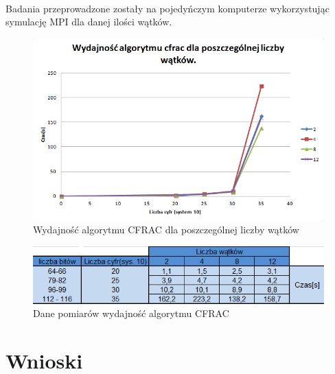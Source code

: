 \documentclass{article}
\begin{document}
\paragraph{}Badania przeprowadzone zostały na pojedyńczym komputerze wykorzystując symulację MPI dla danej ilości wątków.
\begin{figure}[h]
    \centering
    \includegraphics[width=1.0\textwidth]{cfracWydajnosc.png}
    \caption{Wydajność algorytmu CFRAC dla poszczególnej liczby wątków}
    \label{fig:cfracWykres}
\end{figure}
\begin{figure}[h]
    \centering
    \includegraphics[width=1.0\textwidth]{cfracWydajnoscTabela.png}
    \caption{Dane pomiarów wydajność algorytmu CFRAC}
    \label{fig:cfracTabela}
\end{figure}

\section{Wnioski}
\end{document}

